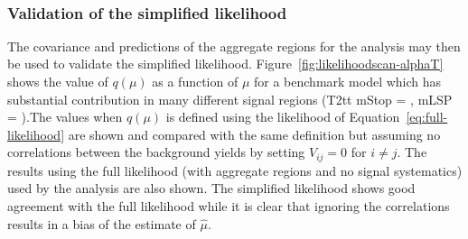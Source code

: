 \begin{figure}[!tbhp]
\begin{center}
     ~~
     \\
  \end{center}
\end{figure}

\subsubsection{Validation of the simplified likelihood}

The covariance and predictions of the aggregate regions for the \alphat analysis may then 
be used to validate the simplified likelihood. Figure~\ref{fig:likelihoodscan-alphaT} shows the value of $q(\mu)$ as a function of $\mu$ for 
a benchmark model which has substantial contribution in many different signal regions 
(T2tt mStop = , mLSP = ).The values when $q(\mu)$ is defined using the likelihood of Equation~\ref{eq:full-likelihood} 
are shown and compared with the same definition but assuming no correlations between the 
background yields by setting $V_{ij}=0$ for $i\neq j$. The results using the full likelihood (with aggregate regions and no signal systematics) 
used by the \alphat analysis are also shown. The simplified likelihood shows good agreement with the full likelihood 
while it is clear that ignoring the correlations results in a bias of the estimate of $\hat{\mu}$. 

